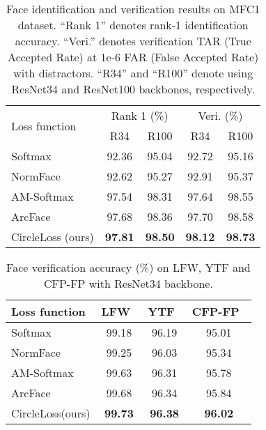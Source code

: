 \documentclass[10pt,twocolumn,letterpaper]{article}
\begin{document}
\begin{table}[t]
    \small
    \centering
    \caption{Face identification and verification results on MFC1 dataset. ``Rank 1'' denotes rank-1 identification accuracy. ``Veri.'' denotes verification TAR (True Accepted Rate) at 1e-6 FAR (False Accepted Rate) with  distractors. ``R34'' and ``R100'' denote using ResNet34 and ResNet100 backbones, respectively.}
    \label{tab:mf1}
    \begin{tabularx}{\linewidth}{Xcccc}
    \toprule
     \multirow{2}{*}{Loss function} & \multicolumn{2}{c}{Rank 1 (\%)} &
     \multicolumn{2}{c}{Veri. (\%)}\\
    \cmidrule(l{2pt}r{2pt}){2-3} \cmidrule(l{2pt}r{2pt}){4-5}
     & R34 & R100 &R34 & R100  \\
     \midrule
     
    Softmax &92.36 &95.04& 92.72 &95.16 \\
    NormFace~\cite{wang2017normface} &92.62  &95.27 &92.91 &95.37 \\
    AM-Softmax~\cite{wang2018additive,Wang_2018_CVPR} &97.54 &98.31 & 97.64 &98.55 \\
    ArcFace~\cite{deng2019arcface} &97.68 & 98.36 &97.70 &98.58 \\
    CircleLoss (ours) &\textbf{97.81} &\textbf{98.50}&\textbf{98.12} &\textbf{98.73} \\
    \bottomrule
    \end{tabularx}
\end{table}
\begin{table}[t]
    \small
    \centering
    \caption{Face verification accuracy (\%) on LFW, YTF and CFP-FP with ResNet34 backbone.}
    \label{tab:face-verif}
    \begin{tabularx}{\linewidth}{lccc}
    \toprule
     Loss function & LFW~\cite{LFWTech}& YTF~\cite{wolf2011face} & CFP-FP~\cite{cfp-paper} \\
     \midrule
    Softmax &99.18 & 96.19& 95.01\\
    NormFace~\cite{wang2017normface} & 99.25 & 96.03 & 95.34\\
    AM-Softmax~\cite{wang2018additive,Wang_2018_CVPR} & 99.63 & 96.31 & 95.78 \\
    ArcFace~\cite{deng2019arcface} & 99.68 & 96.34 & 95.84\\
    CircleLoss(ours) & \textbf{99.73} & \textbf{96.38} & \textbf{96.02} \\
    \bottomrule
    \end{tabularx}
\end{table}
\end{document}
